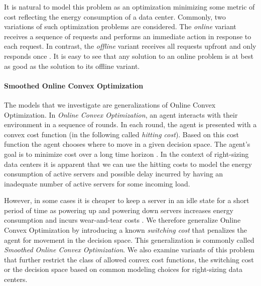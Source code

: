 It is natural to model this problem as an optimization minimizing some metric of cost reflecting the energy consumption of a data center. Commonly, two variations of such optimization problems are considered. The \textit{online} variant receives a sequence of requests and performs an immediate action in response to each request. In contrast, the \textit{offline} variant receives all requests upfront and only responds once \cite{Karp1992}. It is easy to see that any solution to an online problem is at best as good as the solution to its offline variant.

\paragraph{Smoothed Online Convex Optimization} The models that we investigate are generalizations of Online Convex Optimization. In \textit{Online Convex Optimization}, an agent interacts with their environment in a sequence of rounds. In each round, the agent is presented with a convex cost function (in the following called \textit{hitting cost}). Based on this cost function the agent chooses where to move in a given decision space. The agent's goal is to minimize cost over a long time horizon \cite{Hazan2019}. In the context of right-sizing data centers it is apparent that we can use the hitting costs to model the energy consumption of active servers and possible delay incurred by having an inadequate number of active servers for some incoming load.

However, in some cases it is cheaper to keep a server in an idle state for a short period of time as powering up and powering down servers increases energy consumption and incurs wear-and-tear costs \cite{Lin2011}. We therefore generalize Online Convex Optimization by introducing a known \textit{switching cost} that penalizes the agent for movement in the decision space. This generalization is commonly called \textit{Smoothed Online Convex Optimization}. We also examine variants of this problem that further restrict the class of allowed convex cost functions, the switching cost or the decision space based on common modeling choices for right-sizing data centers.

